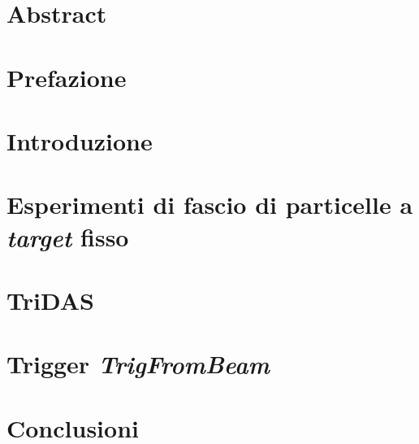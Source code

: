 \documentclass[12pt, a4paper, twoside]{report}
\begin{document}
\begin{titlepage}
    
\end{titlepage}
\setcounter{page}{1}
\chapter*{Abstract}

\chapter*{Prefazione}

\tableofcontents{}
\newpage
\chapter*{Introduzione}

\chapter{Esperimenti di fascio di particelle a \textit{target} fisso}

\chapter{TriDAS}

\chapter{Trigger \emph{TrigFromBeam}}

\chapter*{Conclusioni}

\nocite{*}
\printbibliography
{}
\end{document}
